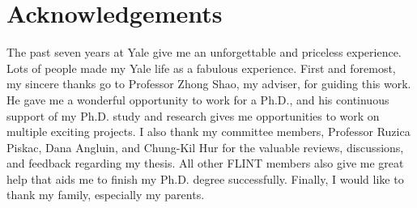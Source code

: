\chapter{Acknowledgements} %

The past seven years at Yale give me an unforgettable and priceless experience.
Lots of people made my Yale life as a fabulous experience. 
First and foremost, my sincere thanks go to  Professor Zhong Shao, my adviser,  for guiding this work. 
He gave me a wonderful opportunity to work for a Ph.D., and his continuous support of my Ph.D. study and research gives me opportunities to work on multiple exciting projects. 
I also thank my committee members, Professor Ruzica Piskac, Dana Angluin, and Chung-Kil Hur for the valuable reviews, discussions, and feedback regarding my thesis. All other FLINT members also give me great help that aids me to finish my Ph.D. degree successfully. 
Finally, I would like to thank my family, especially my parents.



\clearpage
